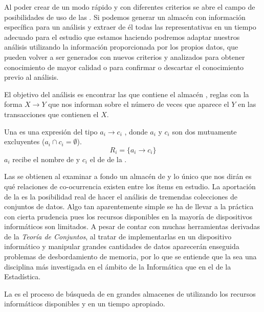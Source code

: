 Al poder crear \D de un modo rápido y con diferentes criterios se abre el campo de posibilidades de uso de las \ars. Si podemos generar un almacén \D con información específica para un análisis y extraer de él todas las \ars representativas en un tiempo adecuado para el estudio que estamos haciendo podremos adaptar nuestros análisis utilizando la información proporcionada por los propios datos, que pueden volver a ser generados con nuevos criterios y analizados para obtener conocimiento de mayor calidad o para confirmar o descartar el conocimiento previo al análisis.

El objetivo del análisis es encontrar las \ARs que contiene el almacén \D, reglas con la forma $X\rightarrow Y$ que nos informan sobre el número de veces que aparece el \itemset $Y$ en las transacciones que contienen el \itemset $X$.

\begin{Definition}[\AR]
   Una \AR es una expresión del tipo $a_i \rightarrow c_i$ , donde $a_i$ y $c_i$ son dos \itemsets mutuamente excluyentes ($a_i \cap c_i = \emptyset$).
  \begin{equation}\label{eqARi}
      R_i = \{a_i\rightarrow c_i\}
  \end{equation}
   \noindent $a_i$ recibe el nombre de \antecedente y $c_i$ el de \consecuente de la \ar.
\label{def:1-3-2-AR}
\end{Definition}

Las \ars se obtienen al examinar a fondo un almacén de \transacciones y lo único que nos dirán es qué relaciones de co-ocurrencia existen entre los ítems en estudio. La aportación de la \arm es la posibilidad real de hacer el análisis de tremendas colecciones de conjuntos de datos. Algo tan aparentemente simple se ha de llevar a la práctica con cierta prudencia pues los recursos disponibles en la mayoría de dispositivos informáticos son limitados. A pesar de contar con muchas herramientas derivadas de la \emph{Teoría de Conjuntos}, al tratar de implementarlas en un dispositivo informático y manipular grandes cantidades de datos aparecerán enseguida problemas de desbordamiento de memoria, por lo que se entiende que la \arm sea una disciplina más investigada en el ámbito de la Informática que en el de la Estadística.

\begin{Definition}
   La \arm es el proceso de búsqueda de \ARs en grandes almacenes de \transacciones utilizando los recursos informáticos disponibles y en un tiempo apropiado.
\label{def:1-3-2-ARM}
\end{Definition}

